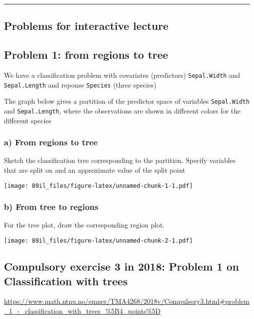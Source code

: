 \documentclass[]{article}
\begin{document}
\begin{center}\rule{0.5\linewidth}{\linethickness}\end{center}

\subsection{Problems for interactive
lecture}\label{problems-for-interactive-lecture}

\subsection{Problem 1: from regions to
tree}\label{problem-1-from-regions-to-tree}

We have a classification problem with covariates (predictors)
\texttt{Sepal.Width} and \texttt{Sepal.Length} and reponse
\texttt{Species} (three species)

The graph below gives a partition of the predictor space of variables
\texttt{Sepal.Width} and \texttt{Sepal.Length}, where the observations
are shown in different colors for the different species

\subsubsection{a) From regions to tree}\label{a-from-regions-to-tree}

Sketch the classification tree corresponding to the partition. Specify
variables that are split on and an approximate value of the split point

\texttt{[image: 89il\_files/figure-latex/unnamed-chunk-1-1.pdf]}

\subsubsection{b) From tree to regions}\label{b-from-tree-to-regions}

For the tree plot, draw the corresponding region plot.

\texttt{[image: 89il\_files/figure-latex/unnamed-chunk-2-1.pdf]}

\subsection{Compulsory exercise 3 in 2018: Problem 1 on Classification
with
trees}\label{compulsory-exercise-3-in-2018-problem-1-on-classification-with-trees}

\url{https://www.math.ntnu.no/emner/TMA4268/2018v/Compulsory3.html\#problem_1_-_classification_with_trees_\%5B4_points\%5D}
\end{document}
